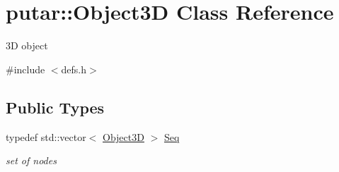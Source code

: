 \hypertarget{classputar_1_1Object3D}{}\section{putar\+:\+:Object3D Class Reference}
\label{classputar_1_1Object3D}


3D object  




{\ttfamily \#include $<$defs.\+h$>$}

\subsection*{Public Types}
\begin{DoxyCompactItemize}
\item 
typedef std\+::vector$<$ \hyperlink{classputar_1_1Object3D}{Object3D} $>$ \hyperlink{classputar_1_1Object3D_a3cb755c7d5fbae630e1a188748cc9ba4}{Seq}\hypertarget{classputar_1_1Object3D_a3cb755c7d5fbae630e1a188748cc9ba4}{}\label{classputar_1_1Object3D_a3cb755c7d5fbae630e1a188748cc9ba4}

\begin{DoxyCompactList}\small\item\em set of nodes \end{DoxyCompactList}\end{DoxyCompactItemize}

